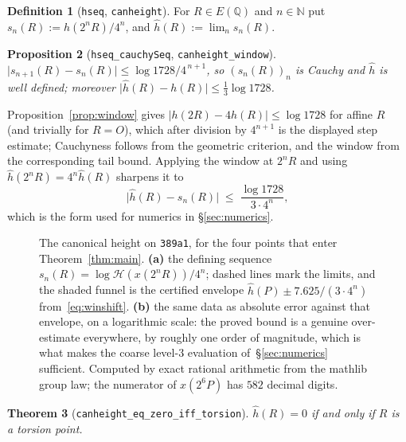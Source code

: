 \documentclass[11pt,reqno]{amsart}
\newcommand{\pffig}[1]{}
\theoremstyle{plain}
\newtheorem{theorem}{Theorem}[section]
\newtheorem{proposition}[theorem]{Proposition}
\theoremstyle{definition}
\newtheorem{definition}[theorem]{Definition}
\theoremstyle{remark}
\DeclareRobustCommand{\lt}[1]{\texttt{#1}}
\newcommand{\hh}{\widehat{h}}
\begin{document}
\begin{definition}[\lt{hseq}, \lt{canheight}]
For $R \in E(\mathbb{Q})$ and $n \in \mathbb{N}$ put
$s_n(R) := h(2^n R)/4^n$, and $\hh(R) := \lim_{n} s_n(R)$.
\end{definition}

\begin{proposition}[\lt{hseq\_cauchySeq}, \lt{canheight\_window}]
$\lvert s_{n+1}(R) - s_n(R)\rvert \le \log 1728 / 4^{\,n+1}$, so
$(s_n(R))_n$ is Cauchy and $\hh$ is well defined; moreover
$\lvert \hh(R) - h(R)\rvert \le \tfrac13 \log 1728$.
\end{proposition}

Proposition~\ref{prop:window} gives
$\lvert h(2R) - 4h(R)\rvert \le \log 1728$ for affine $R$ (and trivially for
$R = O$), which after division by $4^{n+1}$ is the displayed step estimate;
Cauchyness follows from the geometric criterion, and the window from the
corresponding tail bound. Applying the window at $2^nR$ and using
$\hh(2^nR) = 4^n \hh(R)$ sharpens it to
\begin{equation}\label{eq:winshift}
  \lvert \hh(R) - s_n(R)\rvert \;\le\; \frac{\log 1728}{3 \cdot 4^n},
\end{equation}
which is the form used for numerics in \S\ref{sec:numerics}.

\begin{figure}[htbp]
\centering
\pffig{fig_canheight_convergence}
\caption{The canonical height on \texttt{389a1}, for the four points that
enter Theorem~\ref{thm:main}. \textbf{(a)} the defining sequence
$s_n(R) = \log\mathcal{H}(x(2^nR))/4^n$; dashed lines mark the limits, and
the shaded funnel is the certified envelope
$\hh(P) \pm 7.625/(3\cdot4^n)$ from~\eqref{eq:winshift}. \textbf{(b)} the
same data as absolute error against that envelope, on a logarithmic scale:
the proved bound is a genuine over-estimate everywhere, by roughly one order
of magnitude, which is what makes the coarse level-$3$ evaluation
of~\S\ref{sec:numerics} sufficient. Computed by exact rational arithmetic
from the mathlib group law; the numerator of $x(2^6P)$ has $582$ decimal
digits.}
\label{fig:conv}
\end{figure}

\begin{theorem}[\lt{canheight\_eq\_zero\_iff\_torsion}]\label{thm:torsion}
$\hh(R) = 0$ if and only if $R$ is a torsion point.
\end{theorem}
\end{document}

